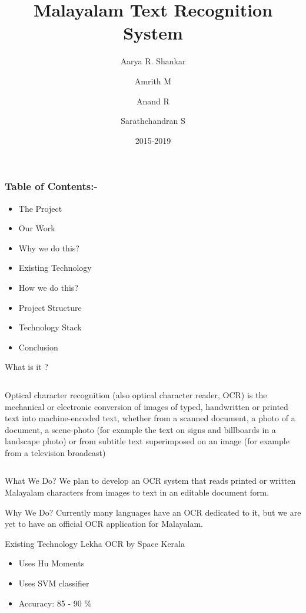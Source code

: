 \documentclass{beamer}
\title{Malayalam Text Recognition System}
\author{Aarya R. Shankar
			\and Amrith M
				 \and Anand R
					\and Sarathchandran S}
\institute{Department of Computer Science\and College of Engineering,Trivandrum}
\date{2015-2019}
\begin{document}
\frame{\titlepage}


\begin{frame}
\frametitle{Table of Contents:-}
\begin{itemize}
\item The Project
\item Our Work
\item Why we do this?
\item Existing Technology
\item How we do this?
\item Project Structure
\item Technology Stack
\item Conclusion
\end{itemize}

\end{frame}


\begin{frame}{What is it ?}

    \begin{columns}[c] %
    \column{\textwidth} %
     Optical character recognition (also optical character reader, OCR) is the mechanical or electronic conversion of images of typed, 
handwritten or printed text into machine-encoded text, whether from a scanned document, a photo of a document, a scene-photo (for example the 
text on signs and billboards in a landscape photo) or from subtitle text superimposed on an image (for example from a television broadcast)
    \end{columns}
\end{frame}



\begin{frame}{What We Do?}
     We plan to develop an OCR system that reads printed or written Malayalam characters from images to text in an editable document form.
\end{frame}

\begin{frame}{Why We Do?}
     Currently many languages have an OCR dedicated to it, but we are yet to have an official OCR application for Malayalam.
\end{frame}

\begin{frame}{Existing Technology}
Lekha OCR by Space Kerala
\begin{itemize}
    \item Uses Hu Moments
    \item Uses SVM classifier
    \item Accuracy: 85 - 90 \%
\end{itemize}
\end{frame}
\end{document}

